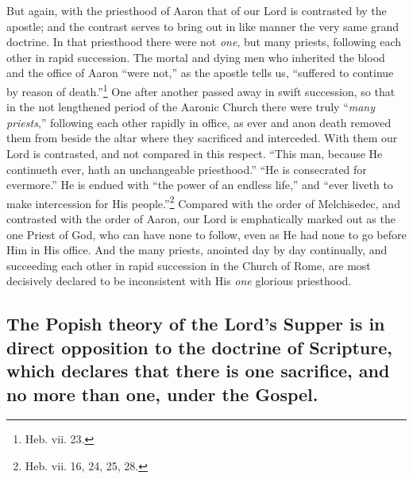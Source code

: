 \documentclass[english,]{book}
\begin{document}
But again, with the priesthood of Aaron that of our Lord is contrasted by the apostle; and the contrast serves to bring out in like manner the very same grand doctrine. In that priesthood there were not \emph{one}, but many priests, following each other in rapid succession. The mortal and dying men who inherited the blood and the office of Aaron ``were not,'' as the apostle tells us, ``suffered to continue by reason of death.''\footnote{Heb. vii. 23.} One after another passed away in swift succession, so that in the not lengthened period of the Aaronic Church there were truly ``\emph{many priests},'' following each other rapidly in office, as ever and anon death removed them from beside the altar where they sacrificed and interceded. With them our Lord is contrasted, and not compared in this respect. ``This man, because He continueth ever, hath an unchangeable priesthood.'' ``He is consecrated for evermore.'' He is endued with ``the power of an endless life,'' and ``ever liveth to make intercession for His people.''\footnote{Heb. vii. 16, 24, 25, 28.} Compared with the order of Melchisedec, and contrasted with the order of Aaron, our Lord is emphatically marked out as the one Priest of God, who can have none to follow, even as He had none to go before Him in His office. And the many priests, anointed day by day continually, and succeeding each other in rapid succession in the Church of Rome, are most decisively declared to be inconsistent with His \emph{one} glorious priesthood.

\hypertarget{the-popish-theory-of-the-lords-supper-is-in-direct-opposition-to-the-doctrine-of-scripture-which-declares-that-there-is-one-sacrifice-and-no-more-than-one-under-the-gospel.}{%
\subsection{The Popish theory of the Lord's Supper is in direct opposition to the doctrine of Scripture, which declares that there is one sacrifice, and no more than one, under the Gospel.}\label{the-popish-theory-of-the-lords-supper-is-in-direct-opposition-to-the-doctrine-of-scripture-which-declares-that-there-is-one-sacrifice-and-no-more-than-one-under-the-gospel.}}
\end{document}
